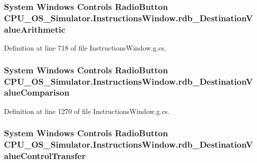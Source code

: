 \subsubsection[{rdb\+\_\+\+Destination\+Value\+Arithmetic}]{\setlength{\rightskip}{0pt plus 5cm}System Windows Controls Radio\+Button C\+P\+U\+\_\+\+O\+S\+\_\+\+Simulator.\+Instructions\+Window.\+rdb\+\_\+\+Destination\+Value\+Arithmetic\hspace{0.3cm}{\ttfamily [package]}}\label{class_c_p_u___o_s___simulator_1_1_instructions_window_a2e87a90d55ec015190b55bd06c273efc}


Definition at line 718 of file Instructions\+Window.\+g.\+cs.

\hypertarget{class_c_p_u___o_s___simulator_1_1_instructions_window_a200445a2378fddf69041aecbbcdf68fb}{}
\subsubsection[{rdb\+\_\+\+Destination\+Value\+Comparison}]{\setlength{\rightskip}{0pt plus 5cm}System Windows Controls Radio\+Button C\+P\+U\+\_\+\+O\+S\+\_\+\+Simulator.\+Instructions\+Window.\+rdb\+\_\+\+Destination\+Value\+Comparison\hspace{0.3cm}{\ttfamily [package]}}\label{class_c_p_u___o_s___simulator_1_1_instructions_window_a200445a2378fddf69041aecbbcdf68fb}


Definition at line 1270 of file Instructions\+Window.\+g.\+cs.

\hypertarget{class_c_p_u___o_s___simulator_1_1_instructions_window_afedaca6e4102fbae9f5db622be1b839d}{}
\subsubsection[{rdb\+\_\+\+Destination\+Value\+Control\+Transfer}]{\setlength{\rightskip}{0pt plus 5cm}System Windows Controls Radio\+Button C\+P\+U\+\_\+\+O\+S\+\_\+\+Simulator.\+Instructions\+Window.\+rdb\+\_\+\+Destination\+Value\+Control\+Transfer\hspace{0.3cm}{\ttfamily [package]}}\label{class_c_p_u___o_s___simulator_1_1_instructions_window_afedaca6e4102fbae9f5db622be1b839d}



